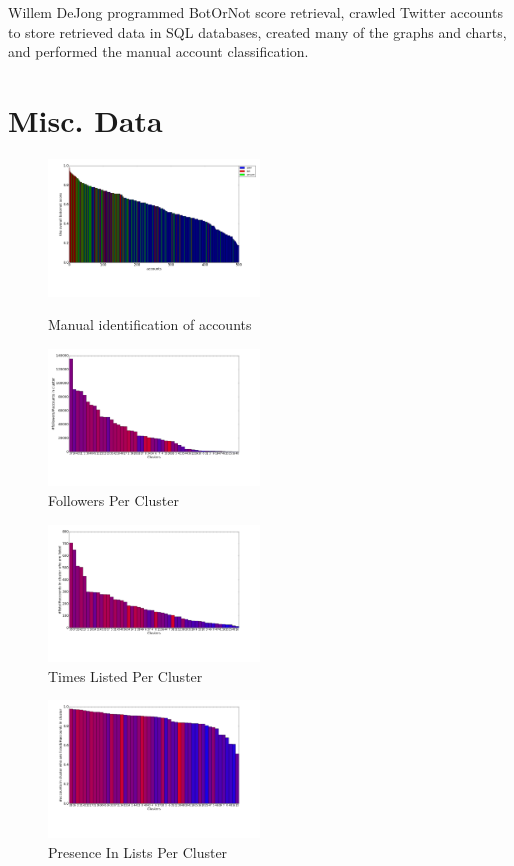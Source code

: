 \documentclass{sig-alternate-05-2015}
\begin{document}
Willem DeJong programmed BotOrNot score retrieval, crawled Twitter accounts to store retrieved data in SQL databases, created many of the graphs and charts, and performed the manual account classification.

\section{Misc. Data}

\begin{figure}[h!]
	\caption{Manual identification of accounts}
	\centering
		\includegraphics[width=0.5\textwidth]{imgs/barvsaccnt}
	\label{fig:barvsaccnt}
\end{figure}

\begin{figure}[h!]
	\caption{Followers Per Cluster}
	\centering
		\includegraphics[width=0.5\textwidth]{imgs/followers}
\end{figure}

\begin{figure}[h!]
	\caption{Times Listed Per Cluster}
	\centering
		\includegraphics[width=0.5\textwidth]{imgs/listed2}
\end{figure}

\begin{figure}[h!]
	\caption{Presence In Lists Per Cluster}
	\centering
		\includegraphics[width=0.5\textwidth]{imgs/listed3}
\end{figure}

\end{document}
